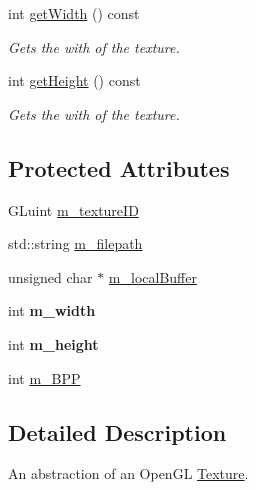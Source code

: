 \begin{DoxyCompactItemize}
int \hyperlink{class_cookie_eng_1_1_resources_1_1_texture_a8f7b83fbbd885d0380100975fe9f5831}{get\+Width} () const
\begin{DoxyCompactList}\small\item\em Gets the with of the texture. \end{DoxyCompactList}\item 
int \hyperlink{class_cookie_eng_1_1_resources_1_1_texture_ac030b164a876de42ad141e9aab422a1c}{get\+Height} () const
\begin{DoxyCompactList}\small\item\em Gets the with of the texture. \end{DoxyCompactList}\end{DoxyCompactItemize}
\subsection*{Protected Attributes}
\begin{DoxyCompactItemize}
\item 
G\+Luint \hyperlink{class_cookie_eng_1_1_resources_1_1_texture_af0b6161b941846749407ba504e68ef5a}{m\+\_\+texture\+ID}
\item 
std\+::string \hyperlink{class_cookie_eng_1_1_resources_1_1_texture_ae67553523fd6d4c29ec23ef180d18bd8}{m\+\_\+filepath}
\item 
unsigned char $\ast$ \hyperlink{class_cookie_eng_1_1_resources_1_1_texture_ab52f89f4a8a5dc91e2581e53857036bf}{m\+\_\+local\+Buffer}
\item 
\mbox{\label{class_cookie_eng_1_1_resources_1_1_texture_ab7a7ce9f87006faa0e921084b0885ce8}} 
int {\bfseries m\+\_\+width}
\item 
\mbox{\label{class_cookie_eng_1_1_resources_1_1_texture_a27412b3f96850a2fa4aabde00741cac5}} 
int {\bfseries m\+\_\+height}
\item 
int \hyperlink{class_cookie_eng_1_1_resources_1_1_texture_ac873fd6475f9059603f79e389089ad48}{m\+\_\+\+B\+PP}
\end{DoxyCompactItemize}


\subsection{Detailed Description}
An abstraction of an Open\+GL \hyperlink{class_cookie_eng_1_1_resources_1_1_texture}{Texture}. 

